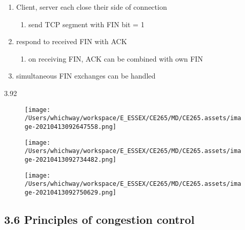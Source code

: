 \documentclass[
]{article}
\begin{document}
\begin{enumerate}
\def\labelenumi{\arabic{enumi}.}
\item
  Client, server each close their side of connection

  \begin{enumerate}
  \def\labelenumii{\arabic{enumii}.}
  \item
    send TCP segment with FIN bit = 1
  \end{enumerate}
\item
  respond to received FIN with ACK

  \begin{enumerate}
  \def\labelenumii{\arabic{enumii}.}
  \item
    on receiving FIN, ACK can be combined with own FIN
  \end{enumerate}
\item
  simultaneous FIN exchanges can be handled
\end{enumerate}

3.92

\begin{figure}
\centering
\texttt{[image: /Users/whichway/workspace/E\_ESSEX/CE265/MD/CE265.assets/image-20210413092647558.png]}
\caption{}
\end{figure}

\begin{figure}
\centering
\texttt{[image: /Users/whichway/workspace/E\_ESSEX/CE265/MD/CE265.assets/image-20210413092734482.png]}
\caption{}
\end{figure}

\begin{figure}
\centering
\texttt{[image: /Users/whichway/workspace/E\_ESSEX/CE265/MD/CE265.assets/image-20210413092750629.png]}
\caption{}
\end{figure}

\hypertarget{36-principles-of-congestion-control}{%
\subsection{\texorpdfstring{3.6 Principles of congestion control
}{3.6 Principles of congestion control }}\label{36-principles-of-congestion-control}}
\end{document}
